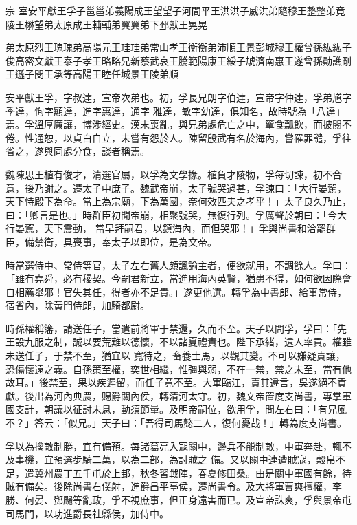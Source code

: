
\begin{pinyinscope}

 宗
 室安平獻王孚子邕邕弟義陽成王望望子河間平王洪洪子威洪弟隨穆王整整弟竟陵王楙望弟太原成王輔輔弟翼翼弟下邳獻王晃晃



 弟太原烈王瑰瑰弟高陽元王珪珪弟常山孝王衡衡弟沛順王景彭城穆王權曾孫紘紘子俊高密文獻王泰子孝王略略兄新蔡武哀王騰範陽康王綏子虓濟南惠王遂曾孫勛譙剛王遜子閔王承等高陽王睦任城景王陵弟順



 安平獻王孚，字叔達，宣帝次弟也。初，孚長兄朗字伯達，宣帝字仲達，孚弟馗字季達，恂字顯達，進字惠達，通字
 雅達，敏字幼達，俱知名，故時號為「八達」焉。孚溫厚廉讓，博涉經史。漢末喪亂，與兄弟處危亡之中，簞食瓢飲，而披閱不倦。性通恕，以貞白自立，未嘗有怨於人。陳留殷武有名於海內，嘗罹罪譴，孚往省之，遂與同處分食，談者稱焉。



 魏陳思王植有俊才，清選官屬，以孚為文學掾。植負才陵物，孚每切諫，初不合意，後乃謝之。遷太子中庶子。魏武帝崩，太子號哭過甚，孚諫曰：「大行晏駕，天下恃殿下為命。當上為宗廟，下為萬國，奈何效匹夫之孝乎！」太子良久乃止，曰：「卿言是也。」時群臣初聞帝崩，相聚號哭，無復行列。孚厲聲於朝曰：「今大行晏駕，天下震動，
 當早拜嗣君，以鎮海內，而但哭邪！」孚與尚書和洽罷群臣，備禁衛，具喪事，奉太子以即位，是為文帝。



 時當選侍中、常侍等官，太子左右舊人頗諷諭主者，便欲就用，不調餘人。孚曰：「雖有堯舜，必有稷契。今嗣君新立，當進用海內英賢，猶患不得，如何欲因際會自相薦舉邪！官失其任，得者亦不足貴。」遂更他選。轉孚為中書郎、給事常侍，宿省內，除黃門侍郎，加騎都尉。



 時孫權稱籓，請送任子，當遣前將軍于禁還，久而不至。天子以問孚，孚曰：「先王設九服之制，誠以要荒難以德懷，不以諸夏禮責也。陛下承緒，遠人率貢。權雖未送任子，于禁不至，猶宜以
 寬待之，畜養士馬，以觀其變。不可以嫌疑責讓，恐傷懷遠之義。自孫策至權，奕世相繼，惟彊與弱，不在一禁，禁之未至，當有他故耳。」後禁至，果以疾遲留，而任子竟不至。大軍臨江，責其違言，吳遂絕不貢獻。後出為河內典農，賜爵關內侯，轉清河太守。初，魏文帝置度支尚書，專掌軍國支計，朝議以征討未息，動須節量。及明帝嗣位，欲用孚，問左右曰：「有兄風不？」答云：「似兄。」天子曰：「吾得司馬懿二人，復何憂哉！」轉為度支尚書。



 孚以為擒敵制勝，宜有備預。每諸葛亮入寇關中，邊兵不能制敵，中軍奔赴，輒不及事機，宜預選步騎二萬，以為二部，為討賊之
 備。又以關中連遭賊寇，穀帛不足，遣冀州農丁五千屯於上邽，秋冬習戰陣，春夏修田桑。由是關中軍國有餘，待賊有備矣。後除尚書右僕射，進爵昌平亭侯，遷尚書令。及大將軍曹爽擅權，李勝、何晏、鄧颺等亂政，孚不視庶事，但正身遠害而已。及宣帝誅爽，孚與景帝屯司馬門，以功進爵長社縣侯，加侍中。




\end{pinyinscope}
